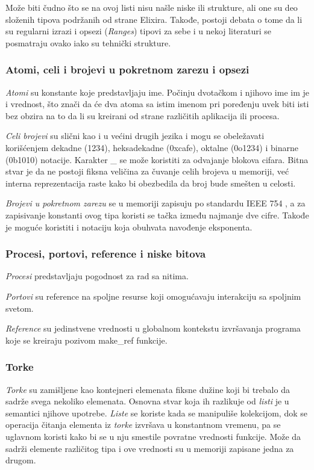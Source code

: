 \documentclass[a4paper]{article}
\begin{document}
Može biti čudno što se na ovoj listi nisu našle niske ili strukture, ali one su deo složenih tipova podržanih od strane Elixira. Takođe, postoji debata o tome da li su regularni izrazi i opsezi (\textit{Ranges}) tipovi za sebe i u nekoj literaturi se posmatraju ovako iako su tehnički strukture. \cite{knjigaElixir}

\subsubsection{Atomi, celi i brojevi u pokretnom zarezu i opsezi}
\label{sec:ime}
\textit{Atomi} su konstante koje predstavljaju ime. Počinju dvotačkom i njihovo ime im je i vrednost, što znači da će dva atoma sa istim imenom pri poređenju uvek biti isti bez obzira na to da li su kreirani od strane različitih aplikacija ili procesa.

\textit{Celi brojevi} su slični kao i u većini drugih jezika i mogu se obeležavati korišćenjem dekadne (1234), heksadekadne (0xcafe), oktalne (0o1234) i binarne (0b1010) notacije. Karakter \_ se može koristiti za odvajanje blokova cifara. Bitna stvar je da ne postoji fiksna veličina za čuvanje celih brojeva u memoriji, već interna reprezentacija raste kako bi obezbedila da broj bude smešten u celosti.

\textit{Brojevi u pokretnom zarezu} se u memoriji zapisuju po standardu IEEE 754 \cite{knjigaElixir}\cite{siteIEEE}, a za zapisivanje konstanti ovog tipa koristi se tačka između najmanje dve cifre. Takođe je moguće koristiti i notaciju koja obuhvata navođenje eksponenta.

\subsubsection{Procesi, portovi, reference i niske bitova}
\label{sec:ime}
\textit{Procesi} predstavljaju pogodnost za rad sa nitima.

\textit{Portovi} su reference na spoljne resurse koji omogućavaju interakciju sa spoljnim svetom.

\textit{Reference} su jedinstvene vrednosti u globalnom kontekstu izvršavanja programa koje se kreiraju pozivom make\_ref funkcije.

\subsubsection{Torke}
\label{sec:ime}
\textit{Torke} su zamišljene kao kontejneri elemenata fiksne dužine koji bi trebalo da sadrže svega nekoliko elemenata. Osnovna stvar koja ih razlikuje od \textit{listi} je u semantici njihove upotrebe. \textit{Liste} se koriste kada se manipuliše kolekcijom, dok se operacija čitanja elementa iz \textit{torke} izvršava u konstantnom vremenu, pa se uglavnom koristi kako bi se u nju smestile povratne vrednosti funkcije. Može da sadrži elemente različitog tipa i ove vrednosti su u memoriji zapisane jedna za drugom.%
\end{document}
